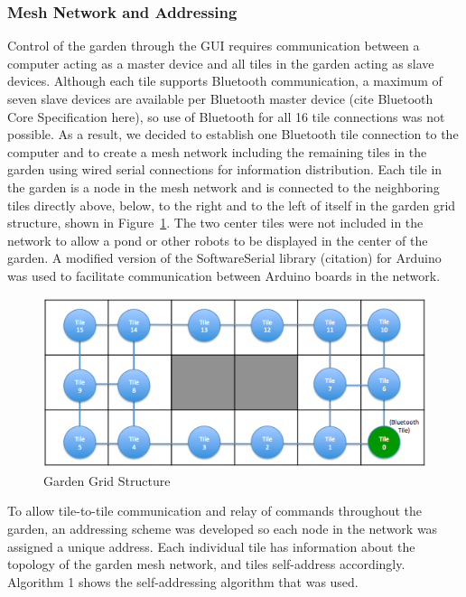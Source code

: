 \documentclass[letterpaper, 10 pt, conference]{ieeeconf}  %
\begin{document}
\subsubsection{\textbf{Mesh Network and Addressing}}
Control of the garden through the GUI requires communication between a computer acting as a master device and all tiles in the garden acting as slave devices. Although each tile supports Bluetooth communication, a maximum of seven slave devices are available per Bluetooth master device (cite Bluetooth Core Specification here), so use of Bluetooth for all 16 tile connections was not possible.  As a result, we decided to establish one Bluetooth tile connection to the computer and to create a mesh network including the remaining tiles in the garden using wired serial connections for information distribution.  Each tile in the garden is a node in the mesh network and is connected to the neighboring tiles directly above, below, to the right and to the left of itself in the garden grid structure, shown in Figure~\ref{fig: Grid}.  The two center tiles were not included in the network to allow a pond or other robots to be displayed in the center of the garden.  A modified version of the  SoftwareSerial library (citation) for Arduino was used to facilitate communication between Arduino boards in the network.  
\begin{figure}[thpb]
	\centering
	\includegraphics[scale=0.45]{GardenGridStructure.png}
	\caption{Garden Grid Structure}
	\label{fig: Grid}
	
\end{figure}


To allow tile-to-tile communication and relay of commands throughout the garden, an addressing scheme was developed so each node in the network was assigned a unique address.  Each individual tile has information about the topology of the garden mesh network, and tiles self-address accordingly.  Algorithm 1 shows the self-addressing algorithm that was used.
\end{document}
